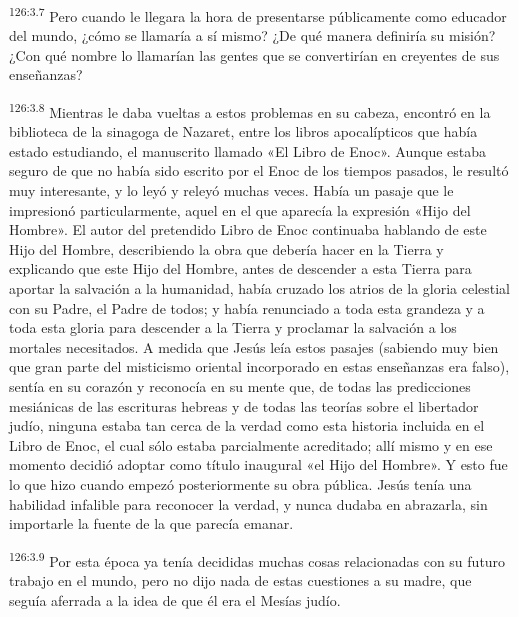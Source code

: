 \par
\textsuperscript{126:3.7} Pero cuando le llegara la hora de presentarse públicamente como educador del mundo, ¿cómo se llamaría a sí mismo? ¿De qué manera definiría su misión? ¿Con qué nombre lo llamarían las gentes que se convertirían en creyentes de sus enseñanzas?

\par
\textsuperscript{126:3.8} Mientras le daba vueltas a estos problemas en su cabeza, encontró en la biblioteca de la sinagoga de Nazaret, entre los libros apocalípticos que había estado estudiando, el manuscrito llamado «El Libro de Enoc». Aunque estaba seguro de que no había sido escrito por el Enoc de los tiempos pasados, le resultó muy interesante, y lo leyó y releyó muchas veces. Había un pasaje que le impresionó particularmente, aquel en el que aparecía la expresión «Hijo del Hombre». El autor del pretendido Libro de Enoc continuaba hablando de este Hijo del Hombre, describiendo la obra que debería hacer en la Tierra y explicando que este Hijo del Hombre, antes de descender a esta Tierra para aportar la salvación a la humanidad, había cruzado los atrios de la gloria celestial con su Padre, el Padre de todos; y había renunciado a toda esta grandeza y a toda esta gloria para descender a la Tierra y proclamar la salvación a los mortales necesitados. A medida que Jesús leía estos pasajes (sabiendo muy bien que gran parte del misticismo oriental incorporado en estas enseñanzas era falso), sentía en su corazón y reconocía en su mente que, de todas las predicciones mesiánicas de las escrituras hebreas y de todas las teorías sobre el libertador judío, ninguna estaba tan cerca de la verdad como esta historia incluida en el Libro de Enoc, el cual sólo estaba parcialmente acreditado; allí mismo y en ese momento decidió adoptar como título inaugural «el Hijo del Hombre». Y esto fue lo que hizo cuando empezó posteriormente su obra pública. Jesús tenía una habilidad infalible para reconocer la verdad, y nunca dudaba en abrazarla, sin importarle la fuente de la que parecía emanar.

\par
\textsuperscript{126:3.9} Por esta época ya tenía decididas muchas cosas relacionadas con su futuro trabajo en el mundo, pero no dijo nada de estas cuestiones a su madre, que seguía aferrada a la idea de que él era el Mesías judío.

